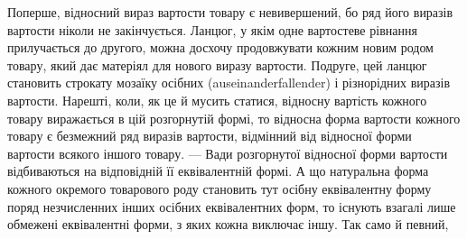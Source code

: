 Поперше, відносний вираз вартости товару є невивершений,
бо ряд його виразів вартости ніколи не закінчується. Ланцюг, у
якім одне вартостеве рівнання прилучається до другого, можна
досхочу продовжувати кожним новим родом товару, який дає
матеріял для нового виразу вартости. Подруге, цей ланцюг становить
строкату мозаїку осібних (auseinanderfallender) і різнорідних
виразів вартости. Нарешті, коли, як це й мусить статися,
відносну вартість кожного товару виражається в цій розгорнутій
формі, то відносна форма вартости кожного товару є безмежний
ряд виразів вартости, відмінний від відносної форми вартости
всякого іншого товару. — Вади розгорнутої відносної форми вартости
відбиваються на відповідній її еквівалентній формі. А що
натуральна форма кожного окремого товарового роду становить
тут осібну еквівалентну форму поряд незчисленних інших осібних
еквівалентних форм, то існують взагалі лише обмежені еквівалентні
форми, з яких кожна виключає іншу. Так само й певний,
\parbreak{}  %
